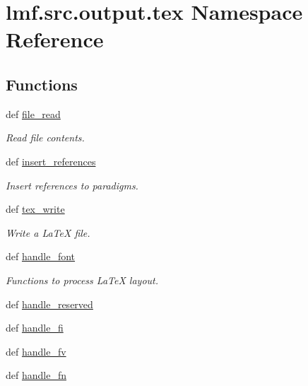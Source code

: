 \hypertarget{namespacelmf_1_1src_1_1output_1_1tex}{\section{lmf.\+src.\+output.\+tex Namespace Reference}
\label{namespacelmf_1_1src_1_1output_1_1tex}
}
\subsection*{Functions}
\begin{DoxyCompactItemize}
\item 
def \hyperlink{namespacelmf_1_1src_1_1output_1_1tex_add0a1198eaf15d3c6303038718684dec}{file\+\_\+read}
\begin{DoxyCompactList}\small\item\em Read file contents. \end{DoxyCompactList}\item 
def \hyperlink{namespacelmf_1_1src_1_1output_1_1tex_ab81efa044d47f387368ae4f11af1bde3}{insert\+\_\+references}
\begin{DoxyCompactList}\small\item\em Insert references to paradigms. \end{DoxyCompactList}\item 
def \hyperlink{namespacelmf_1_1src_1_1output_1_1tex_a2f69a7ff35d3a419eaa9f4bb40aefa06}{tex\+\_\+write}
\begin{DoxyCompactList}\small\item\em Write a La\+Te\+X file. \end{DoxyCompactList}\item 
def \hyperlink{namespacelmf_1_1src_1_1output_1_1tex_acdd13e0489e158f24036a243e21cb484}{handle\+\_\+font}
\begin{DoxyCompactList}\small\item\em Functions to process La\+Te\+X layout. \end{DoxyCompactList}\item 
def \hyperlink{namespacelmf_1_1src_1_1output_1_1tex_a736bc9a68d1249aa48f7f063f6860eb8}{handle\+\_\+reserved}
\item 
def \hyperlink{namespacelmf_1_1src_1_1output_1_1tex_a981c81cbc251b5e8d97caf9b0e4fb8bd}{handle\+\_\+fi}
\item 
def \hyperlink{namespacelmf_1_1src_1_1output_1_1tex_ae073d345dc8c6432ee6c2c4f138624f6}{handle\+\_\+fv}
\item 
def \hyperlink{namespacelmf_1_1src_1_1output_1_1tex_a5aaf8cb83b14ae9eec529d9b5ee79e2a}{handle\+\_\+fn}

\end{DoxyCompactItemize}
